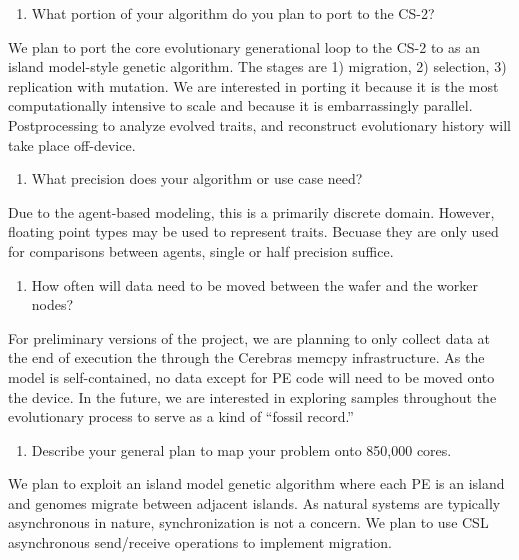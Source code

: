 \begin{enumerate}[resume] \itshape \bfseries
\item What portion of your algorithm do you plan to port to the CS-2?
\end{enumerate}
\noindent
We plan to port the core evolutionary generational loop to the CS-2 to as an island model-style genetic algorithm.
The stages are 1) migration, 2) selection, 3) replication with mutation.
We are interested in porting it because it is the most computationally intensive to scale and because it is embarrassingly parallel.
Postprocessing to analyze evolved traits, and reconstruct evolutionary history will take place off-device.

\begin{enumerate}[resume] \itshape \bfseries
\item %
What precision does your algorithm or use case need?
\end{enumerate}
\noindent
Due to the agent-based modeling, this is a primarily discrete domain.
However, floating point types may be used to represent traits.
Becuase they are only used for comparisons between agents, single or half precision suffice.

\begin{enumerate}[resume] \itshape \bfseries
\item %
How often will data need to be moved between the wafer and the worker nodes?
\end{enumerate}
\noindent
For preliminary versions of the project, we are planning to only collect data at the end of execution the through the Cerebras memcpy infrastructure.
As the model is self-contained, no data except for PE code will need to be moved onto the device.
In the future, we are interested in exploring samples throughout the evolutionary process to serve as a kind of ``fossil record.''

\begin{enumerate}[resume] \itshape \bfseries
\item Describe your general plan to map your problem onto 850,000 cores. 
\end{enumerate}
\noindent
We plan to exploit an island model genetic algorithm where each PE is an island and genomes migrate between adjacent islands.
As natural systems are typically asynchronous in nature, synchronization is not a concern.
We plan to use CSL asynchronous send/receive operations to implement migration.

